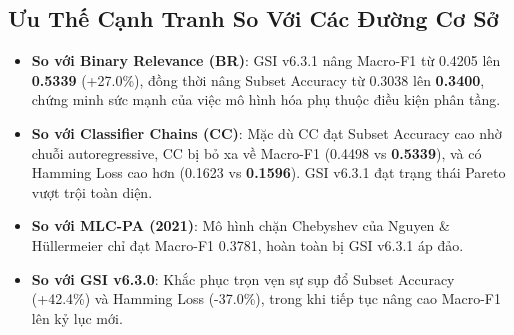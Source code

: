 \documentclass[10pt,a4paper,twoside]{article}
\begin{document}
\subsection{Ưu Thế Cạnh Tranh So Với Các Đường Cơ Sở}
\begin{itemize}[leftmargin=*]
    \item \textbf{So với Binary Relevance (BR)}: GSI v6.3.1 nâng Macro-F1 từ 0.4205 lên \textbf{0.5339} (+27.0\%), đồng thời nâng Subset Accuracy từ 0.3038 lên \textbf{0.3400}, chứng minh sức mạnh của việc mô hình hóa phụ thuộc điều kiện phân tầng.
    \item \textbf{So với Classifier Chains (CC)}: Mặc dù CC đạt Subset Accuracy cao nhờ chuỗi autoregressive, CC bị bỏ xa về Macro-F1 (0.4498 vs \textbf{0.5339}), và có Hamming Loss cao hơn (0.1623 vs \textbf{0.1596}). GSI v6.3.1 đạt trạng thái Pareto vượt trội toàn diện.
    \item \textbf{So với MLC-PA (2021)}: Mô hình chặn Chebyshev của Nguyen \& Hüllermeier chỉ đạt Macro-F1 0.3781, hoàn toàn bị GSI v6.3.1 áp đảo.
    \item \textbf{So với GSI v6.3.0}: Khắc phục trọn vẹn sự sụp đổ Subset Accuracy (+42.4\%) và Hamming Loss (-37.0\%), trong khi tiếp tục nâng cao Macro-F1 lên kỷ lục mới.
\end{itemize}
\end{document}
